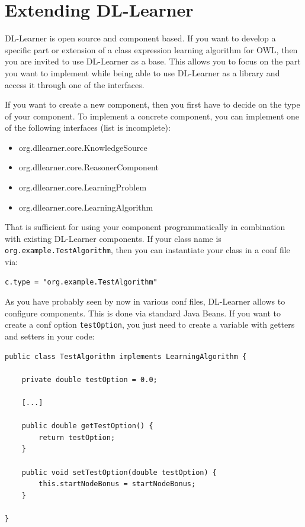 \documentclass[a4paper,12pt]{scrartcl}
\begin{document}
\section{Extending DL-Learner}
\label{sec:developing}

DL-Learner is open source and component based. If you want to develop a specific part or extension of a class expression learning algorithm for OWL, then you are invited to use DL-Learner as a base. This allows you to focus on the part you want to implement while being able to use DL-Learner as a library and access it through one of the interfaces. 

If you want to create a new component, then you first have to decide on the type of your component. To implement a concrete component, you can implement one of the following interfaces (list is incomplete):

\begin{itemize}
 \item org.dllearner.core.KnowledgeSource
 \item org.dllearner.core.ReasonerComponent
 \item org.dllearner.core.LearningProblem
 \item org.dllearner.core.LearningAlgorithm
\end{itemize}

That is sufficient for using your component programmatically in combination with existing DL-Learner components.
If your class name is \verb|org.example.TestAlgorithm|, then you can instantiate your class in a conf file via:
\begin{verbatim}
c.type = "org.example.TestAlgorithm"
\end{verbatim}

As you have probably seen by now in various conf files, DL-Learner allows to configure components. This is done via standard Java Beans. If you want to create a conf option \verb|testOption|, you just need to create a variable with getters and setters in your code:

\begin{verbatim}
public class TestAlgorithm implements LearningAlgorithm {

    private double testOption = 0.0;

    [...]

    public double getTestOption() {
        return testOption;
    }

    public void setTestOption(double testOption) {
        this.startNodeBonus = startNodeBonus;
    }

}
\end{verbatim}
\end{document}
